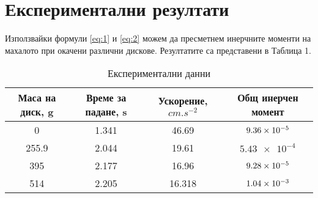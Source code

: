 \documentclass[aps, prb, twocolumn, a4paper, floatfix, reprint]{revtex4-2}
\begin{document}
\section{Експериментални резултати}
Използвайки формули \eqref{eq:1} и \eqref{eq:2} можем да пресметнем инерчните моменти на махалото при окачени различни дискове. Резултатите са представени в Таблица 1.  

\begin{table}[H]
    \label{tab:1}
    \caption{Експериментални данни}
    \begin{ruledtabular}
        \begin{tabular}{*{4}{c}}
            \multicolumn{1}{p{2cm}}{Маса на диск, g} &
            \multicolumn{1}{p{2cm}}{Време за падане, s} &
            \multicolumn{1}{p{2cm}}{Ускорение, $cm.s^{-2}$} &
            \multicolumn{1}{p{2cm}}{Общ инерчен момент} \\[2pt] 
            \midrule
            0 & 1.341 & 46.69 & $\num{9.36E-5}$ \\ 
            255.9 & 2.044 & 19.61 & $\num{5.43e-4}$ \\
            395 & 2.177 & 16.96 & $\num{9.28E-5}$ \\
            514 & 2.205 & 16.318 & $\num{1.04E-3}$ \\
        \end{tabular}
    \end{ruledtabular}
\end{table}
\end{document}
